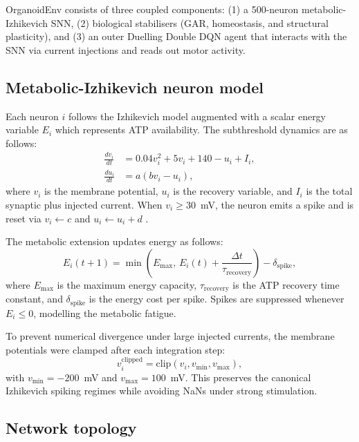 \documentclass[journal]{IEEEtran}
\begin{document}
OrganoidEnv consists of three coupled components: (1) a 500-neuron metabolic-Izhikevich SNN, (2) biological stabilisers (GAR, homeostasis, and structural plasticity), and (3) an outer Duelling Double DQN agent that interacts with the SNN via current injections and reads out motor activity.

\subsection{Metabolic-Izhikevich neuron model}

Each neuron $i$ follows the Izhikevich model augmented with a scalar energy variable $E_i$ which represents ATP availability. 
The subthreshold dynamics are as follows:
\begin{align}
\frac{dv_i}{dt} &= 0.04 v_i^2 + 5 v_i + 140 - u_i + I_i, \label{eq:izh_v} \\
\frac{du_i}{dt} &= a (b v_i - u_i),
\end{align}
where $v_i$ is the membrane potential, $u_i$ is the recovery variable, and $I_i$ is the total synaptic plus injected current. 
When $v_i \geq 30$~mV, the neuron emits a spike and is reset via $v_i \leftarrow c$ and $u_i \leftarrow u_i + d$ \cite{Izhikevich2003simple}.

The metabolic extension updates energy as follows:
\begin{equation}
E_i(t+1) = \min\left(E_{\max},\, E_i(t) + \frac{\Delta t}{\tau_{\mathrm{recovery}}}\right) - \delta_{\mathrm{spike}},
\label{eq:energy}
\end{equation}
where $E_{\max}$ is the maximum energy capacity, $\tau_{\mathrm{recovery}}$ is the ATP recovery time constant, and $\delta_{\mathrm{spike}}$ is the energy cost per spike. 
Spikes are suppressed whenever $E_i \leq 0$, modelling the metabolic fatigue.

To prevent numerical divergence under large injected currents, the membrane potentials were clamped after each integration step:
\begin{equation}
v_i^{\mathrm{clipped}} = \mathrm{clip}(v_i, v_{\min}, v_{\max}),
\end{equation}
with $v_{\min} = -200$~mV and $v_{\max} = 100$~mV. 
This preserves the canonical Izhikevich spiking regimes while avoiding NaNs under strong stimulation.

\subsection{Network topology}
\end{document}
